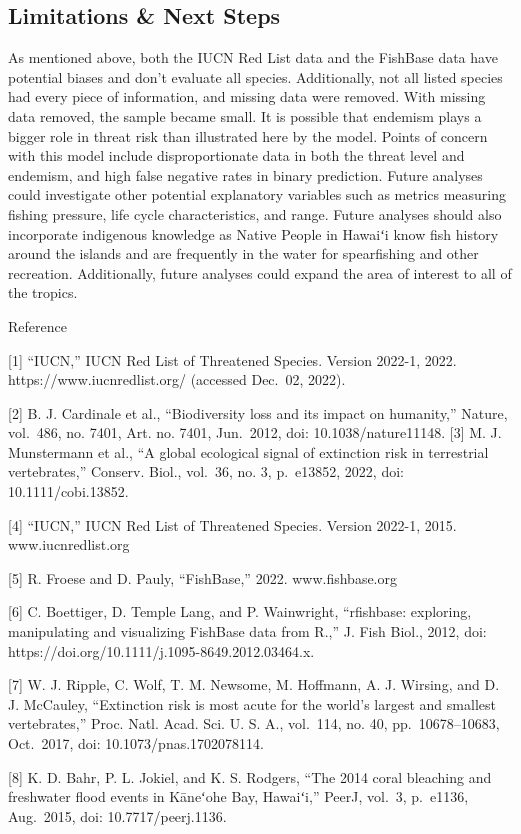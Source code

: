 \documentclass[
  letterpaper,
  DIV=11,
  numbers=noendperiod]{scrartcl}
\begin{document}
\hypertarget{limitations-next-steps}{%
\subsection{Limitations \& Next Steps}\label{limitations-next-steps}}

As mentioned above, both the IUCN Red List data and the FishBase data
have potential biases and don't evaluate all species. Additionally, not
all listed species had every piece of information, and missing data were
removed. With missing data removed, the sample became small. It is
possible that endemism plays a bigger role in threat risk than
illustrated here by the model. Points of concern with this model include
disproportionate data in both the threat level and endemism, and high
false negative rates in binary prediction. Future analyses could
investigate other potential explanatory variables such as metrics
measuring fishing pressure, life cycle characteristics, and range.
Future analyses should also incorporate indigenous knowledge as Native
People in Hawaiʻi know fish history around the islands and are
frequently in the water for spearfishing and other recreation.
Additionally, future analyses could expand the area of interest to all
of the tropics.

Reference

{[}1{]} ``IUCN,'' IUCN Red List of Threatened Species. Version 2022-1,
2022. https://www.iucnredlist.org/ (accessed Dec.~02, 2022).

{[}2{]} B. J. Cardinale et al., ``Biodiversity loss and its impact on
humanity,'' Nature, vol.~486, no. 7401, Art. no. 7401, Jun.~2012, doi:
10.1038/nature11148. {[}3{]} M. J. Munstermann et al., ``A global
ecological signal of extinction risk in terrestrial vertebrates,''
Conserv. Biol., vol.~36, no. 3, p.~e13852, 2022, doi:
10.1111/cobi.13852.

{[}4{]} ``IUCN,'' IUCN Red List of Threatened Species. Version 2022-1,
2015. www.iucnredlist.org

{[}5{]} R. Froese and D. Pauly, ``FishBase,'' 2022. www.fishbase.org

{[}6{]} C. Boettiger, D. Temple Lang, and P. Wainwright, ``rfishbase:
exploring, manipulating and visualizing FishBase data from R.,'' J. Fish
Biol., 2012, doi: https://doi.org/10.1111/j.1095-8649.2012.03464.x.

{[}7{]} W. J. Ripple, C. Wolf, T. M. Newsome, M. Hoffmann, A. J.
Wirsing, and D. J. McCauley, ``Extinction risk is most acute for the
world's largest and smallest vertebrates,'' Proc. Natl. Acad. Sci. U. S.
A., vol.~114, no. 40, pp.~10678--10683, Oct.~2017, doi:
10.1073/pnas.1702078114.

{[}8{]} K. D. Bahr, P. L. Jokiel, and K. S. Rodgers, ``The 2014 coral
bleaching and freshwater flood events in Kāneʻohe Bay, Hawaiʻi,'' PeerJ,
vol.~3, p.~e1136, Aug.~2015, doi: 10.7717/peerj.1136.
\end{document}

